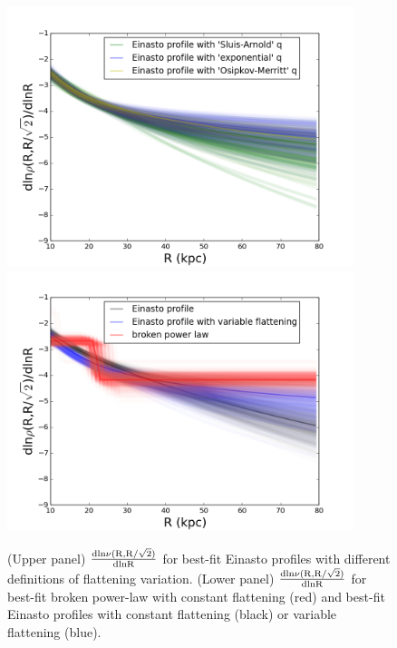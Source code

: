 \documentclass[12pt,preprint]{aastex}
\begin{document}
\begin{figure}[htbp]
\centering
\includegraphics[width=0.9\textwidth,height=0.45\textheight]{density_45d_compareqv}
\includegraphics[width=0.9\textwidth,height=0.45\textheight]{density_45d_mcmc}
\caption{(Upper panel) $\rm \frac{dln\nu(R,R/\sqrt{2})}{dlnR}$ for best-fit Einasto profiles with different definitions of flattening variation. (Lower panel) $\rm \frac{dln\nu(R,R/\sqrt{2})}{dlnR}$ for best-fit broken power-law with constant flattening (red) and best-fit Einasto profiles with constant flattening (black) or variable flattening (blue).}
\label{f:fdensity}
\end{figure}
\end{document}

